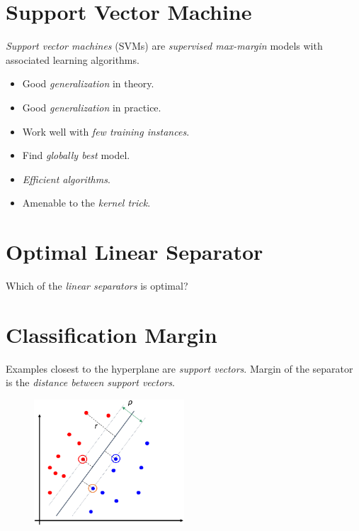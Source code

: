 \documentclass[
	number={2},
	title={Learning Linear Separators{,} SVMs and Kernels}
]{cs584notes}
\begin{document}
\section{Support Vector Machine}\label{sec:svm}
\emph{Support vector machines} (SVMs) are \emph{supervised max-margin} models with associated learning algorithms.
\begin{itemize}
	\item Good \emph{generalization} in theory.
	\item Good \emph{generalization} in practice.
	\item Work well with \emph{few training instances}.
	\item Find \emph{globally best} model.
	\item \emph{Efficient algorithms}.
	\item Amenable to the \emph{kernel trick}.
\end{itemize}

\section{Optimal Linear Separator}\label{sec:optimal-linear-separator}
Which of the \emph{linear separators} is optimal?

\section{Classification Margin}\label{sec:classification-margin}
Examples closest to the hyperplane are \emph{support vectors}.
Margin \data{$\rho$} of the separator is the \emph{distance between support vectors}.

\begin{figure}[H]
	\centering
	\includegraphics[width=0.5\textwidth]{figures/2/classification_margin}
	\caption{}
	\label{fig:classification-margin}
\end{figure}
\end{document}
